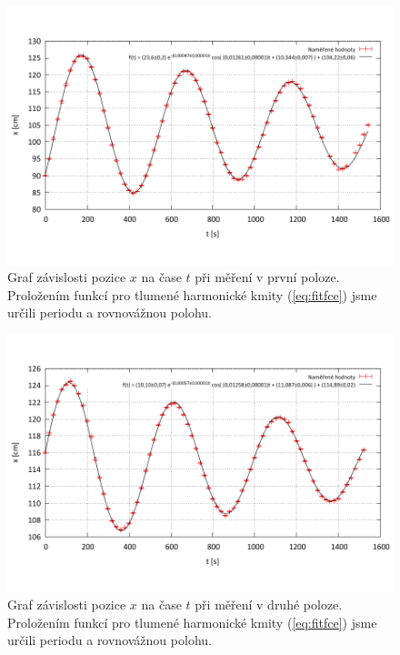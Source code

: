 \documentclass[english]{article}
\begin{document}
	\begin{figure}[h!]
	\begin{center}
	\vspace*{-1.5cm}
	    \includegraphics[width=\linewidth]{../gnuplot/data_1.pdf}
	    \vspace*{-1.5cm}
	    	\caption{Graf závislosti pozice $x$ na čase $t$ při měření v první poloze. Proložením funkcí pro tlumené harmonické kmity (\ref{eq:fitfce}) jsme určili periodu a rovnovážnou polohu.}
			\label{fig:g_1}
	\end{center}
	\end{figure}

	\begin{figure}[h!]
	\begin{center}
	\vspace*{-1.5cm}
	    \includegraphics[width=\linewidth]{../gnuplot/data_2.pdf}
	    \vspace*{-1.5cm}
	    	\caption{Graf závislosti pozice $x$ na čase $t$ při měření v druhé poloze. Proložením funkcí pro tlumené harmonické kmity (\ref{eq:fitfce}) jsme určili periodu a rovnovážnou polohu.}
			\label{fig:g_2}
	\end{center}
	\end{figure}

	
\end{document}
